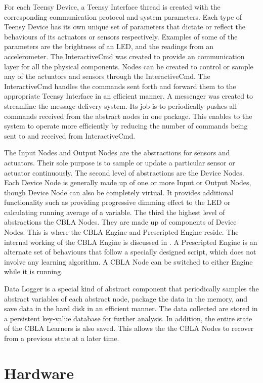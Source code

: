 For each Teensy Device, a Teensy Interface thread is created with the corresponding communication protocol and system parameters. Each type of Teensy Device has its own unique set of parameters that dictate or reflect the behaviours of its actuators or sensors respectively. Examples of some of the parameters are the brightness of an LED, and the readings from an accelerometer. The InteractiveCmd was created to provide an communication layer for all the physical components. Nodes can be created to control or sample any of the actuators and sensors through the InteractiveCmd. The InteractiveCmd handles the commands sent forth and forward them to the appropriate Teensy Interface in an efficient manner. A messenger was created to streamline the message delivery system. Its job is to periodically pushes all commands received from the abstract nodes in one package. This enables to the system to operate more efficiently by reducing the number of commands being sent to and received from InteractiveCmd. 

The Input Nodes and Output Nodes are the abstractions for sensors and actuators. Their sole purpose is to sample or update a particular sensor or actuator continuously. The second level of abstractions are the Device Nodes. Each Device Node is generally made up of one or more Input or Output Nodes, though Device Node can also be completely virtual. It provides additional functionality such as providing progressive dimming effect to the LED or calculating running average of a variable. The third the highest level of abstractions the CBLA Nodes. They are made up of components of Device Nodes. This is where the CBLA Engine and Prescripted Engine reside. The internal working of the CBLA Engine is discussed in . A Prescripted Engine is an alternate set of behaviours that follow a specially designed script, which does not involve any learning algorithm. A CBLA Node can be switched to either Engine while it is running. 

Data Logger is a special kind of abstract component that periodically samples the abstract variables of each abstract node, package the data in the memory, and save data in the hard disk in an efficient manner. The data collected are stored in a persistent key-value database for further analysis. In addition, the entire state of the CBLA Learners is also saved. This allows the the CBLA Nodes to recover from a previous state at a later time.


\section{Hardware} \label{sec:hardware}

